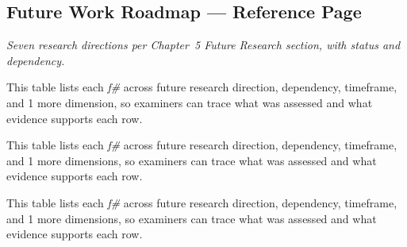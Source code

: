 \subsection{Future Work Roadmap --- Reference Page}
\label{sec:ch5_future_work_roadmap}

\noindent\emph{Seven research directions per Chapter~5 Future Research section, with status and dependency.}


\noindent This table lists each \textit{f\#} across future research direction, dependency, timeframe, and 1 more dimension, so examiners can trace what was assessed and what evidence supports each row.



\noindent This table lists each \textit{f\#} across future research direction, dependency, timeframe, and 1 more dimensions, so examiners can trace what was assessed and what evidence supports each row.


\noindent This table lists each \textit{f\#} across future research direction, dependency, timeframe, and 1 more dimensions, so examiners can trace what was assessed and what evidence supports each row.



